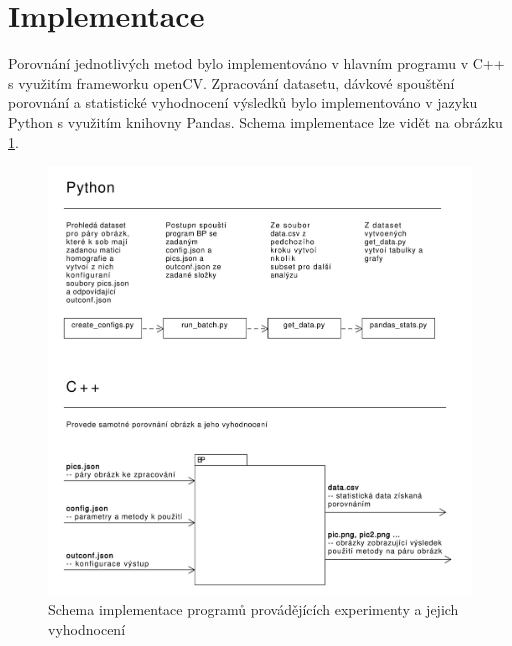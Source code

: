 

\section{Implementace}

Porovnání jednotlivých metod bylo implementováno v hlavním programu v C++ s využitím frameworku openCV. Zpracování datasetu, dávkové spouštění porovnání a statistické vyhodnocení výsledků bylo implementováno v jazyku Python s využitím knihovny Pandas. Schema implementace lze vidět na obrázku \ref{impl_uml}.

\begin{figure}[!ht] 
	\centering
	\includegraphics[width=6in]{img/impl_uml.pdf}
	\caption{Schema implementace programů provádějících experimenty a jejich vyhodnocení} \label{impl_uml}
\end{figure}

